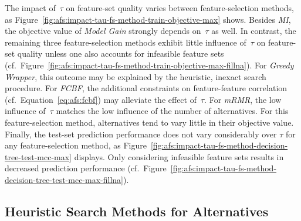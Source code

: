 \documentclass{article}
\theoremstyle{definition}
\begin{document}
The impact of~$\tau$ on feature-set quality varies between feature-selection methods, as Figure~\ref{fig:afs:impact-tau-fs-method-train-objective-max} shows.
Besides \emph{MI}, the objective value of \emph{Model Gain} strongly depends on~$\tau$ as well.
In contrast, the remaining three feature-selection methods exhibit little influence of~$\tau$ on feature-set quality unless one also accounts for infeasible feature sets (cf.~Figure~\ref{fig:afs:impact-tau-fs-method-train-objective-max-fillna}).
For \emph{Greedy Wrapper}, this outcome may be explained by the heuristic, inexact search procedure.
For \emph{FCBF}, the additional constraints on feature-feature correlation (cf.~Equation~\ref{eq:afs:fcbf}) may alleviate the effect of~$\tau$.
For \emph{mRMR}, the low influence of~$\tau$ matches the low influence of the number of alternatives.
For this feature-selection method, alternatives tend to vary little in their objective value.
Finally, the test-set prediction performance does not vary considerably over $\tau$ for any feature-selection method, as Figure~\ref{fig:afs:impact-tau-fs-method-decision-tree-test-mcc-max} displays.
Only considering infeasible feature sets results in decreased prediction performance (cf.~Figure~\ref{fig:afs:impact-tau-fs-method-decision-tree-test-mcc-max-fillna}).

\subsection{Heuristic Search Methods for Alternatives}
\label{sec:afs:evaluation:heuristic-search-methods}
\end{document}
